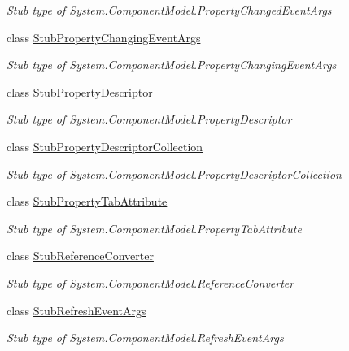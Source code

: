 \begin{DoxyCompactItemize}
\begin{DoxyCompactList}\small\item\em Stub type of System.\-Component\-Model.\-Property\-Changed\-Event\-Args\end{DoxyCompactList}\item 
class \hyperlink{class_system_1_1_component_model_1_1_fakes_1_1_stub_property_changing_event_args}{Stub\-Property\-Changing\-Event\-Args}
\begin{DoxyCompactList}\small\item\em Stub type of System.\-Component\-Model.\-Property\-Changing\-Event\-Args\end{DoxyCompactList}\item 
class \hyperlink{class_system_1_1_component_model_1_1_fakes_1_1_stub_property_descriptor}{Stub\-Property\-Descriptor}
\begin{DoxyCompactList}\small\item\em Stub type of System.\-Component\-Model.\-Property\-Descriptor\end{DoxyCompactList}\item 
class \hyperlink{class_system_1_1_component_model_1_1_fakes_1_1_stub_property_descriptor_collection}{Stub\-Property\-Descriptor\-Collection}
\begin{DoxyCompactList}\small\item\em Stub type of System.\-Component\-Model.\-Property\-Descriptor\-Collection\end{DoxyCompactList}\item 
class \hyperlink{class_system_1_1_component_model_1_1_fakes_1_1_stub_property_tab_attribute}{Stub\-Property\-Tab\-Attribute}
\begin{DoxyCompactList}\small\item\em Stub type of System.\-Component\-Model.\-Property\-Tab\-Attribute\end{DoxyCompactList}\item 
class \hyperlink{class_system_1_1_component_model_1_1_fakes_1_1_stub_reference_converter}{Stub\-Reference\-Converter}
\begin{DoxyCompactList}\small\item\em Stub type of System.\-Component\-Model.\-Reference\-Converter\end{DoxyCompactList}\item 
class \hyperlink{class_system_1_1_component_model_1_1_fakes_1_1_stub_refresh_event_args}{Stub\-Refresh\-Event\-Args}
\begin{DoxyCompactList}\small\item\em Stub type of System.\-Component\-Model.\-Refresh\-Event\-Args\end{DoxyCompactList}\item 

\end{DoxyCompactItemize}
